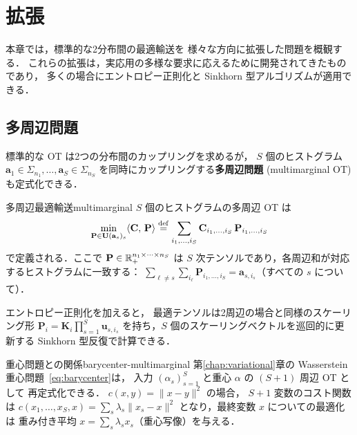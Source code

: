 
\chapter{拡張}\label{chap:extensions}

本章では，標準的な2分布間の最適輸送を
様々な方向に拡張した問題を概観する．
これらの拡張は，実応用の多様な要求に応えるために開発されてきたものであり，
多くの場合にエントロピー正則化と Sinkhorn 型アルゴリズムが適用できる．


\section{多周辺問題}\label{sec:multimarginal}

標準的な OT は2つの分布間のカップリングを求めるが，
$S$ 個のヒストグラム $\mathbf{a}_1 \in \Sigma_{n_1}, \ldots, \mathbf{a}_S \in \Sigma_{n_S}$
を同時にカップリングする\textbf{多周辺問題} (multimarginal OT) も定式化できる．

\begin{definition}{多周辺最適輸送}{multimarginal}
$S$ 個のヒストグラムの多周辺 OT は
\begin{equation}\label{eq:multimarginal}
  \min_{\mathbf{P} \in \mathbf{U}(\mathbf{a}_s)_s}
  \langle \mathbf{C},\, \mathbf{P} \rangle
  \overset{\mathrm{def}}{=} \sum_{i_1, \ldots, i_S}
  \mathbf{C}_{i_1, \ldots, i_S}\, \mathbf{P}_{i_1, \ldots, i_S}
\end{equation}
で定義される．ここで $\mathbf{P} \in \mathbb{R}^{n_1 \times \cdots \times n_S}_+$ は
$S$ 次テンソルであり，各周辺和が対応するヒストグラムに一致する：
$\sum_{\ell \neq s} \sum_{i_\ell} \mathbf{P}_{i_1, \ldots, i_S}
= \mathbf{a}_{s, i_s}$（すべての $s$ について）．
\end{definition}

エントロピー正則化を加えると，
最適テンソルは2周辺の場合と同様のスケーリング形
$\mathbf{P}_i = \mathbf{K}_i \prod_{s=1}^S \mathbf{u}_{s, i_s}$
を持ち，$S$ 個のスケーリングベクトルを巡回的に更新する
Sinkhorn 型反復で計算できる．

\begin{remark}{重心問題との関係}{barycenter-multimarginal}
第\ref{chap:variational}章の Wasserstein 重心問題~\eqref{eq:barycenter}は，
入力 $(\alpha_s)_{s=1}^S$ と重心 $\alpha$ の $(S+1)$ 周辺 OT として
再定式化できる．
$c(x,y) = \|x - y\|^2$ の場合，
$S+1$ 変数のコスト関数は
$c(x_1, \ldots, x_S, x) = \sum_s \lambda_s \|x_s - x\|^2$
となり，最終変数 $x$ についての最適化は
重み付き平均 $x = \sum_s \lambda_s x_s$（重心写像）を与える．
\end{remark}

